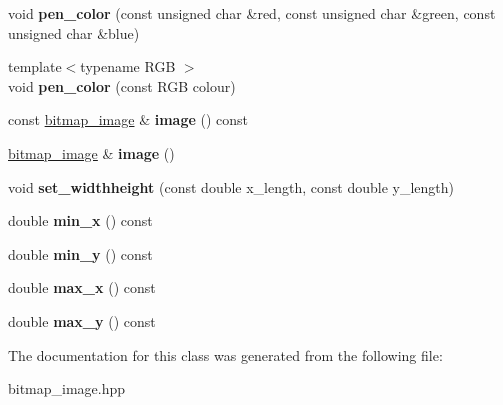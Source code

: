 \begin{DoxyCompactItemize}
void {\bfseries pen\+\_\+color} (const unsigned char \&red, const unsigned char \&green, const unsigned char \&blue)
\item 
\mbox{\label{classcartesian__canvas_ace70856b392cfab2f42d4df1b803bada}} 
{\footnotesize template$<$typename R\+GB $>$ }\\void {\bfseries pen\+\_\+color} (const R\+GB colour)
\item 
\mbox{\label{classcartesian__canvas_a611c69455dfdb27bad96f7015203179e}} 
const \mbox{\hyperlink{classbitmap__image}{bitmap\+\_\+image}} \& {\bfseries image} () const
\item 
\mbox{\label{classcartesian__canvas_a2e1642a31a7e1c7aa74ad101427ccaca}} 
\mbox{\hyperlink{classbitmap__image}{bitmap\+\_\+image}} \& {\bfseries image} ()
\item 
\mbox{\label{classcartesian__canvas_a96214d532f1d8878ba09fad09943fddc}} 
void {\bfseries set\+\_\+widthheight} (const double x\+\_\+length, const double y\+\_\+length)
\item 
\mbox{\label{classcartesian__canvas_a4e7310a0bd074d97ad11f6a2cb763921}} 
double {\bfseries min\+\_\+x} () const
\item 
\mbox{\label{classcartesian__canvas_a550ec5a4d3690ffe0e9ae7f53a4d166c}} 
double {\bfseries min\+\_\+y} () const
\item 
\mbox{\label{classcartesian__canvas_a857ca2d592963bf0de3c2693facbc568}} 
double {\bfseries max\+\_\+x} () const
\item 
\mbox{\label{classcartesian__canvas_a09c71afec4404110dba9e48ae338a1b6}} 
double {\bfseries max\+\_\+y} () const
\end{DoxyCompactItemize}


The documentation for this class was generated from the following file\+:\begin{DoxyCompactItemize}
\item 
bitmap\+\_\+image.\+hpp\end{DoxyCompactItemize}

